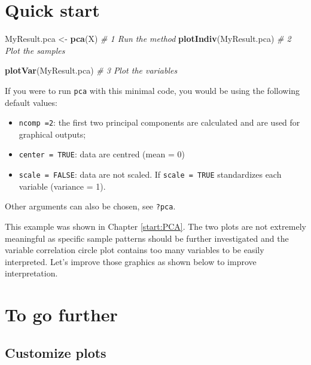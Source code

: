 \documentclass[]{book}
\newenvironment{Shaded}{\begin{snugshade}}{\end{snugshade}}
\newcommand{\CommentTok}[1]{\textcolor[rgb]{0.56,0.35,0.01}{\textit{#1}}}
\newcommand{\KeywordTok}[1]{\textcolor[rgb]{0.13,0.29,0.53}{\textbf{#1}}}
\newcommand{\NormalTok}[1]{#1}
\newcommand{\StringTok}[1]{\textcolor[rgb]{0.31,0.60,0.02}{#1}}
\providecommand{\tightlist}{%
  \setlength{\itemsep}{0pt}\setlength{\parskip}{0pt}}
\begin{document}
\hypertarget{quick-start}{%
\section{Quick start}\label{quick-start}}

\begin{Shaded}
\begin{Highlighting}[]
\NormalTok{MyResult.pca <-}\StringTok{ }\KeywordTok{pca}\NormalTok{(X)     }\CommentTok{# 1 Run the method}
\KeywordTok{plotIndiv}\NormalTok{(MyResult.pca)    }\CommentTok{# 2 Plot the samples}
\end{Highlighting}
\end{Shaded}

\begin{Shaded}
\begin{Highlighting}[]
\KeywordTok{plotVar}\NormalTok{(MyResult.pca)      }\CommentTok{# 3 Plot the variables}
\end{Highlighting}
\end{Shaded}

If you were to run \texttt{pca} with this minimal code, you would be using the following default values:

\begin{itemize}
\tightlist
\item
  \texttt{ncomp\ =2}: the first two principal components are calculated and are used for graphical outputs;
\item
  \texttt{center\ =\ TRUE}: data are centred (mean = 0)
\item
  \texttt{scale\ =\ FALSE}: data are not scaled. If \texttt{scale\ =\ TRUE} standardizes each variable (variance = 1).
\end{itemize}

Other arguments can also be chosen, see \texttt{?pca}.

This example was shown in Chapter \ref{start:PCA}. The two plots are not extremely meaningful as specific sample patterns should be further investigated and the variable correlation circle plot contains too many variables to be easily interpreted. Let's improve those graphics as shown below to improve interpretation.

\hypertarget{to-go-further}{%
\section{To go further}\label{to-go-further}}

\hypertarget{customize-plots}{%
\subsection{Customize plots}\label{customize-plots}}
\end{document}
